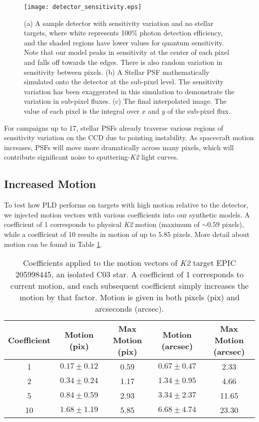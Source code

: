 \documentclass[12pt,preprint]{aastex}
\begin{document}
\begin{figure}[h]
	\centering
	\texttt{[image: detector\_sensitivity.eps]}
	\caption{(a) A sample detector with sensitivity variation and no stellar targets, where white represents 100\% photon detection efficiency, and the shaded regions have lower values for quantum sensitivity. Note that our model peaks in sensitivity at the center of each pixel and falls off towards the edges. There is also random variation in sensitivity between pixels. (b) A Stellar PSF mathematically simulated onto the detector at the sub-pixel level. The sensitivity variation has been exaggerated in this simulation to demonstrate the variation in sub-pixel fluxes. (c) The final interpolated image. The value of each pixel is the integral over $x$ and $y$ of the sub-pixel flux.}
	\label{fig:detector_sensitivity}
\end{figure}

For campaigns up to 17, stellar PSFs already traverse various regions of sensitivity variation on the CCD due to pointing instability. As spacecraft motion increases, PSFs will move more dramatically across many pixels, which will contribute significant noise to sputtering-\textit{K2} light curves.

\subsection{Increased Motion}

To test how PLD performs on targets with high motion relative to the detector, we injected motion vectors with various coefficients into our synthetic models. A coefficient of 1 corresponds to physical \textit{K2} motion (maximum of $\sim 0.59$ pixels), while a coefficient of 10 results in motion of up to $5.85$ pixels. More detail about motion can be found in Table \ref{table:motionstatistics}.

\begin{table}[h!]
\begin{center}
    \begin{tabular}{c | c | c | c | c}
        Coefficient & Motion (pix) & Max Motion (pix) & Motion (arcsec) & Max Motion (arcsec) \\
        \hline \hline
        1 & $0.17\pm0.12$ & 0.59 & $0.67\pm0.47$ & 2.33 \\
        2 & $0.34\pm0.24$ & 1.17 & $1.34\pm0.95$ & 4.66 \\
				5 & $0.84\pm0.59$ & 2.93 & $3.34\pm2.37$ & 11.65 \\
				10 & $1.68\pm1.19$ & 5.85 & $6.68\pm4.74$ & 23.30 \\
   \end{tabular}
	 \caption{Coefficients applied to the motion vectors of \textit{K2} target EPIC 205998445, an isolated C03 star. A coefficient of 1 corresponds to current motion, and each subsequent coefficient simply increases the motion by that factor. Motion is given in both pixels (pix) and arcseconds (arcsec).}
	 \label{table:motionstatistics}
\end{center}
\end{table}
\end{document}
